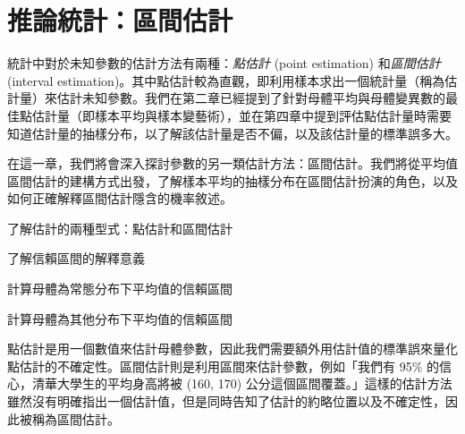 \chapter{推論統計：區間估計}

    統計中對於未知參數的估計方法有兩種：\textit{點估計} (point estimation) 和\textit{區間估計} (interval estimation)。其中點估計較為直觀，即利用樣本求出一個統計量（稱為估計量）來估計未知參數。我們在第二章已經提到了針對母體平均與母體變異數的最佳點估計量（即樣本平均與樣本變藝術），並在第四章中提到評估點估計量時需要知道估計量的抽樣分布，以了解該估計量是否不偏，以及該估計量的標準誤多大。
    
    在這一章，我們將會深入探討參數的另一類估計方法：區間估計。我們將從平均值區間估計的建構方式出發，了解樣本平均的抽樣分布在區間估計扮演的角色，以及如何正確解釋區間估計隱含的機率敘述。
    
    \begin{introduction}
        \item 了解估計的兩種型式：點估計和區間估計
        \item 了解信賴區間的解釋意義
        \item 計算母體為常態分布下平均值的信賴區間
        \item 計算母體為其他分布下平均值的信賴區間
    \end{introduction}

    點估計是用一個數值來估計母體參數，因此我們需要額外用估計值的標準誤來量化點估計的不確定性。區間估計則是利用區間來估計參數，例如「我們有 95\% 的信心，清華大學生的平均身高將被 (160, 170) 公分這個區間覆蓋。」這樣的估計方法雖然沒有明確指出一個估計值，但是同時告知了估計的約略位置以及不確定性，因此被稱為區間估計。
    
